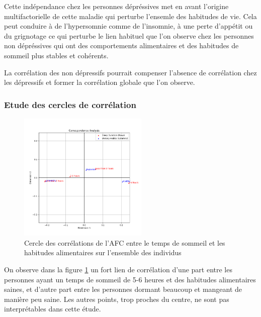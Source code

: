 Cette indépendance chez les personnes dépréssives met en avant l'origine multifactorielle de cette maladie qui perturbe l'ensemle des habitudes de vie. Cela peut conduire à de l'hypersomnie comme de l'insomnie, à une perte d'appétit ou du grignotage ce qui perturbe le lien habituel que l'on observe chez les personnes non dépréssives qui ont des comportements alimentaires et des habitudes de sommeil plus stables et cohérents. 

La corrélation des non dépressifs pourrait compenser l'absence de corrélation chez les dépressifs et former la corrélation globale que l'on observe. 

\subsubsection{Etude des cercles de corrélation}

\begin{figure}[!h]
  \begin{center}
    \includegraphics[width=0.55\textwidth]{Images/Sleep_Dietary_all/Corr_circle.png}
  \end{center}
  \caption{Cercle des corrélations de l'AFC entre le temps de sommeil et les habitudes alimentaires sur l'ensemble des individus}\label{fig:corrSleepDietaryAll}
\end{figure}

On observe dans la figure \ref{fig:corrSleepDietaryAll} un fort lien de corrélation d'une part entre les personnes ayant un temps de sommeil de 5-6 heures et des habitudes alimentaires saines, et d'autre part entre les personnes dormant beaucoup et mangeant de manière peu saine. Les autres points, trop proches du centre, ne sont pas interprétables dans cette étude. 


